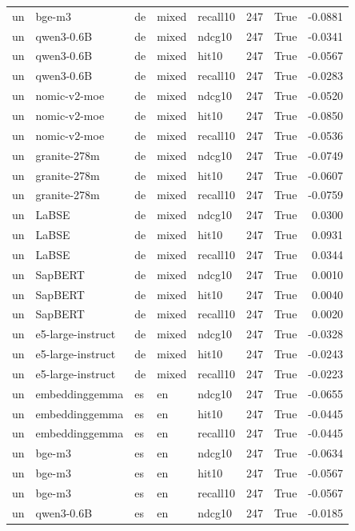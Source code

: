 \begin{tabular}{lllllrrr}
un & bge-m3 & de & mixed & recall10 & 247 & True & -0.0881 \\
un & qwen3-0.6B & de & mixed & ndcg10 & 247 & True & -0.0341 \\
un & qwen3-0.6B & de & mixed & hit10 & 247 & True & -0.0567 \\
un & qwen3-0.6B & de & mixed & recall10 & 247 & True & -0.0283 \\
un & nomic-v2-moe & de & mixed & ndcg10 & 247 & True & -0.0520 \\
un & nomic-v2-moe & de & mixed & hit10 & 247 & True & -0.0850 \\
un & nomic-v2-moe & de & mixed & recall10 & 247 & True & -0.0536 \\
un & granite-278m & de & mixed & ndcg10 & 247 & True & -0.0749 \\
un & granite-278m & de & mixed & hit10 & 247 & True & -0.0607 \\
un & granite-278m & de & mixed & recall10 & 247 & True & -0.0759 \\
un & LaBSE & de & mixed & ndcg10 & 247 & True & 0.0300 \\
un & LaBSE & de & mixed & hit10 & 247 & True & 0.0931 \\
un & LaBSE & de & mixed & recall10 & 247 & True & 0.0344 \\
un & SapBERT & de & mixed & ndcg10 & 247 & True & 0.0010 \\
un & SapBERT & de & mixed & hit10 & 247 & True & 0.0040 \\
un & SapBERT & de & mixed & recall10 & 247 & True & 0.0020 \\
un & e5-large-instruct & de & mixed & ndcg10 & 247 & True & -0.0328 \\
un & e5-large-instruct & de & mixed & hit10 & 247 & True & -0.0243 \\
un & e5-large-instruct & de & mixed & recall10 & 247 & True & -0.0223 \\
un & embeddinggemma & es & en & ndcg10 & 247 & True & -0.0655 \\
un & embeddinggemma & es & en & hit10 & 247 & True & -0.0445 \\
un & embeddinggemma & es & en & recall10 & 247 & True & -0.0445 \\
un & bge-m3 & es & en & ndcg10 & 247 & True & -0.0634 \\
un & bge-m3 & es & en & hit10 & 247 & True & -0.0567 \\
un & bge-m3 & es & en & recall10 & 247 & True & -0.0567 \\
un & qwen3-0.6B & es & en & ndcg10 & 247 & True & -0.0185 \\

\end{tabular}
